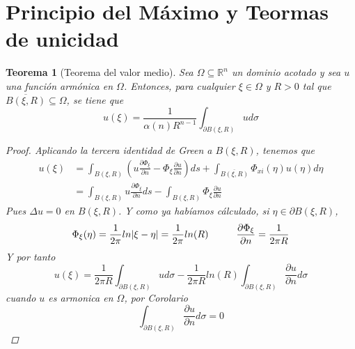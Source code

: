 \documentclass[11pt]{book}
\theoremstyle{plain}
\newtheorem{teo}[proposición]{Teorema}
\theoremstyle{definition}
\newcommand{\R}{\mathbb{R}}
\begin{document}
    \section{Principio del Máximo y Teormas de unicidad}
    \begin{teo}[Teorema del valor medio]
        Sea $\Omega \subseteq \R^{n}$ un dominio acotado y sea $u$ una función armónica en $\Omega$. Entonces, para cualquier $\xi\in\Omega$ y $R > 0$ tal que $\overline{B(\xi,R)} \subseteq \Omega$, se tiene que
        \[
            u(\xi) = \frac{1}{\alpha(n)R^{n-1}}\int_{\partial B(\xi,R)} u d\sigma
        \]
        \begin{proof}
            Aplicando la tercera identidad de Green a $B(\xi,R)$, tenemos que
            \begin{align*}
                u(\xi) &= \int_{B(\xi,R)} \left(u\frac{\partial \Phi_{\xi}}{\partial n} - \Phi_{\xi}\frac{\partial u}{\partial n}\right) ds + \int_{\overline{B(\xi, R)}} \Phi_{xi}(\eta)u(\eta)d\eta\\
                        &= \int_{B(\xi,R)} u\frac{\partial \Phi_{\xi}}{\partial n} ds - \int_{B(\xi,R)} \Phi_{\xi}\frac{\partial u}{\partial n}
            \end{align*}
            Pues $\Delta u = 0$ en $B(\xi,R)$. Y como ya habíamos cálculado, si $\eta\in \partial B(\xi, R)$,
            \[
                \Phi_{\xi}(\eta) = \frac{1}{2\pi}ln|\xi - \eta| = \frac{1}{2\pi}ln(R) \hspace{10mm} \frac{\partial \Phi_{\xi}}{\partial n} = \frac{1}{2\pi R}
            \]
            Y por tanto
            \[
                u(\xi) = \frac{1}{2\pi R}\int_{\partial B(\xi,R)} u d\sigma - \frac{1}{2\pi R}ln(R)\int_{\partial B(\xi,R)} \frac{\partial u}{\partial n} d\sigma
            \]
            cuando $u$ es armonica en $\Omega$, por Corolario
            \[
                \int_{\partial B(\xi,R)}\frac{\partial u}{\partial n} d\sigma = 0  
            \]
        \end{proof}
    \end{teo}
\end{document}
